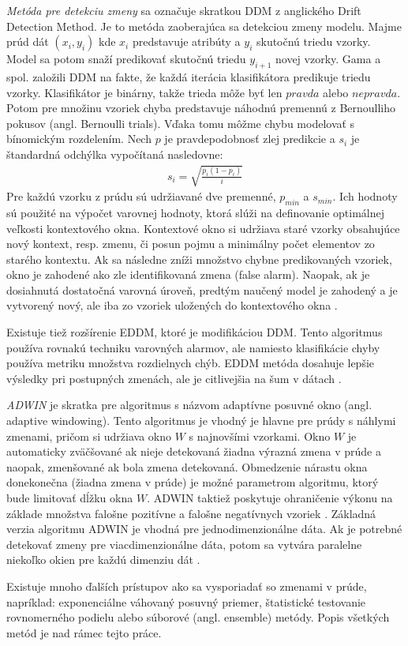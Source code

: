 \textit{Metóda pre detekciu zmeny} sa označuje skratkou DDM z anglického Drift Detection Method. Je to metóda zaoberajúca sa detekciou zmeny modelu. Majme prúd dát $(x_i,y_i)$ kde $x_i$ predstavuje atribúty a $y_i$ skutočnú triedu vzorky. Model sa potom snaží predikovať skutočnú triedu $y_{i+1}$ novej vzorky. Gama a spol. založili DDM na fakte, že každá iterácia klasifikátora predikuje triedu vzorky. Klasifikátor je binárny, takže trieda môže byť len $pravda$ alebo $nepravda$. Potom pre množinu vzoriek chyba predstavuje náhodnú premennú z Bernoulliho pokusov (angl. Bernoulli trials). Vďaka tomu môžme chybu modelovať s bínomickým rozdelením. Nech $p$ je pravdepodobnosť zlej predikcie a $s_i$ je štandardná odchýlka vypočítaná nasledovne:
\begin{align*}
s_i = \sqrt{ \frac{p_i(1-p_i)} {i} }
\end{align*}
Pre každú vzorku z prúdu sú udržiavané dve premenné, $p_{min}$ a $s_{min}$. Ich hodnoty sú použité na výpočet varovnej hodnoty, ktorá slúži na definovanie optimálnej veľkosti kontextového okna. Kontextové okno si udržiava staré vzorky obsahujúce nový kontext, resp. zmenu, či posun pojmu a minimálny počet elementov zo starého kontextu. Ak sa následne zníži množstvo chybne predikovaných vzoriek, okno je zahodené ako zle identifikovaná zmena (false alarm). Naopak, ak je dosiahnutá dostatočná varovná úroveň, predtým naučený model je zahodený a je vytvorený nový, ale iba zo vzoriek uložených do kontextového okna \citep{gama2004learning, brzezinski2010mining}.
\par
Existuje tiež rozšírenie EDDM, ktoré je modifikáciou DDM. Tento algoritmus používa rovnakú techniku varovných alarmov, ale namiesto klasifikácie chyby používa metriku množstva rozdielnych chýb. EDDM metóda dosahuje lepšie výsledky pri postupných zmenách, ale je citlivejšia na šum v dátach \citep{wadewale2015survey}.

\textit{ADWIN} je skratka pre algoritmus s názvom adaptívne posuvné okno (angl. adaptive windowing). Tento algoritmus je vhodný je hlavne pre prúdy s náhlymi zmenami, pričom si udržiava okno $W$ s najnovšími vzorkami. Okno $W$ je automaticky zväčšované ak nieje detekovaná žiadna výrazná zmena v prúde a naopak, zmenšované ak bola zmena detekovaná. Obmedzenie nárastu okna donekonečna (žiadna zmena v prúde) je možné parametrom algoritmu, ktorý bude limitovať dĺžku okna $W$. ADWIN taktiež poskytuje ohraničenie výkonu na základe množstva falošne pozitívne a falošne negatívnych vzoriek \citep{wadewale2015survey}. Základná verzia algoritmu ADWIN je vhodná pre jednodimenzionálne dáta. Ak je potrebné detekovať zmeny pre viacdimenzionálne dáta, potom sa vytvára paralelne niekoľko okien pre každú dimenziu dát \citep{brzezinski2010mining}.
\par
Existuje mnoho ďalších prístupov ako sa vysporiadať so zmenami v prúde, napríklad: exponenciálne váhovaný posuvný priemer, štatistické testovanie rovnomerného podielu alebo súborové (angl. ensemble) metódy. Popis všetkých metód je nad rámec tejto práce.



